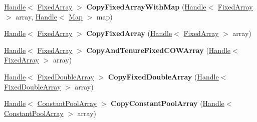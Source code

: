 \begin{DoxyCompactItemize}
\item 
\hypertarget{classv8_1_1internal_1_1_v8___f_i_n_a_l_ade85bd71490785160b5c3270062ecc01}{}\hyperlink{classv8_1_1internal_1_1_handle}{Handle}$<$ \hyperlink{classv8_1_1internal_1_1_fixed_array}{Fixed\+Array} $>$ {\bfseries Copy\+Fixed\+Array\+With\+Map} (\hyperlink{classv8_1_1internal_1_1_handle}{Handle}$<$ \hyperlink{classv8_1_1internal_1_1_fixed_array}{Fixed\+Array} $>$ array, \hyperlink{classv8_1_1internal_1_1_handle}{Handle}$<$ \hyperlink{classv8_1_1internal_1_1_map}{Map} $>$ map)\label{classv8_1_1internal_1_1_v8___f_i_n_a_l_ade85bd71490785160b5c3270062ecc01}

\item 
\hypertarget{classv8_1_1internal_1_1_v8___f_i_n_a_l_a411ae76c9486362581d09f8f155a116a}{}\hyperlink{classv8_1_1internal_1_1_handle}{Handle}$<$ \hyperlink{classv8_1_1internal_1_1_fixed_array}{Fixed\+Array} $>$ {\bfseries Copy\+Fixed\+Array} (\hyperlink{classv8_1_1internal_1_1_handle}{Handle}$<$ \hyperlink{classv8_1_1internal_1_1_fixed_array}{Fixed\+Array} $>$ array)\label{classv8_1_1internal_1_1_v8___f_i_n_a_l_a411ae76c9486362581d09f8f155a116a}

\item 
\hypertarget{classv8_1_1internal_1_1_v8___f_i_n_a_l_a83b90ec2cb7db013b776a83229ccc630}{}\hyperlink{classv8_1_1internal_1_1_handle}{Handle}$<$ \hyperlink{classv8_1_1internal_1_1_fixed_array}{Fixed\+Array} $>$ {\bfseries Copy\+And\+Tenure\+Fixed\+C\+O\+W\+Array} (\hyperlink{classv8_1_1internal_1_1_handle}{Handle}$<$ \hyperlink{classv8_1_1internal_1_1_fixed_array}{Fixed\+Array} $>$ array)\label{classv8_1_1internal_1_1_v8___f_i_n_a_l_a83b90ec2cb7db013b776a83229ccc630}

\item 
\hypertarget{classv8_1_1internal_1_1_v8___f_i_n_a_l_a4bf6c631ce448c25292f95ac67c8abb5}{}\hyperlink{classv8_1_1internal_1_1_handle}{Handle}$<$ \hyperlink{classv8_1_1internal_1_1_fixed_double_array}{Fixed\+Double\+Array} $>$ {\bfseries Copy\+Fixed\+Double\+Array} (\hyperlink{classv8_1_1internal_1_1_handle}{Handle}$<$ \hyperlink{classv8_1_1internal_1_1_fixed_double_array}{Fixed\+Double\+Array} $>$ array)\label{classv8_1_1internal_1_1_v8___f_i_n_a_l_a4bf6c631ce448c25292f95ac67c8abb5}

\item 
\hypertarget{classv8_1_1internal_1_1_v8___f_i_n_a_l_a695d32fa97f4bc13a4c7b401e99b4414}{}\hyperlink{classv8_1_1internal_1_1_handle}{Handle}$<$ \hyperlink{classv8_1_1internal_1_1_constant_pool_array}{Constant\+Pool\+Array} $>$ {\bfseries Copy\+Constant\+Pool\+Array} (\hyperlink{classv8_1_1internal_1_1_handle}{Handle}$<$ \hyperlink{classv8_1_1internal_1_1_constant_pool_array}{Constant\+Pool\+Array} $>$ array)\label{classv8_1_1internal_1_1_v8___f_i_n_a_l_a695d32fa97f4bc13a4c7b401e99b4414}


\end{DoxyCompactItemize}
